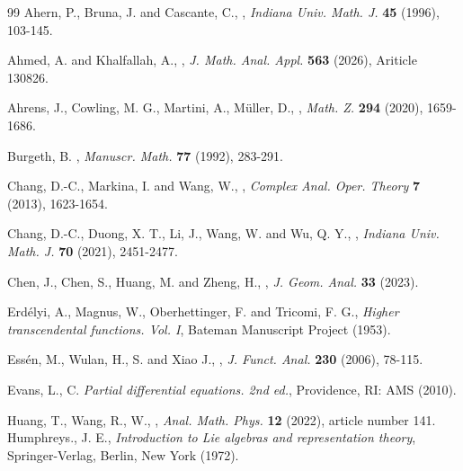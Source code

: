 \documentclass[a4paper,11pt]{amsart}
\numberwithin{equation}{section}
\begin{document}
\begin{thebibliography}{99}
Ahern, P., Bruna, J. and Cascante, C.,
, {\it Indiana Univ. Math. J.} \textbf{45} (1996), 103-145.

Ahmed, A. and Khalfallah, A.,
, {\it J. Math. Anal. Appl.} \textbf{563} (2026), Ariticle 130826.


Ahrens, J., Cowling, M. G., Martini, A., M\"{u}ller, D.,
, {\it Math. Z.} \textbf{294} (2020), 1659-1686.


Burgeth, B.
, {\it Manuscr. Math.} \textbf{77} (1992), 283-291.

Chang, D.-C., Markina, I. and  Wang, W., , \emph{Complex Anal. Oper. Theory} \textbf{7} (2013), 1623-1654.

Chang, D.-C., Duong, X. T., Li, J., Wang, W. and Wu, Q. Y., , {\it  Indiana Univ. Math. J.} \textbf{70} (2021), 2451-2477.

Chen, J., Chen, S., Huang, M. and Zheng, H., , {\it  J. Geom. Anal.} \textbf{33} (2023).


Erd{\'e}lyi, A., Magnus, W., Oberhettinger, F. and Tricomi, F. G.,
{\it Higher transcendental functions. {Vol}. {I}}, {\rm Bateman Manuscript Project} (1953).


Ess\'{e}n, M., Wulan, H., S. and Xiao J.,
,
{\it J. Funct. Anal. } \textbf{230} (2006), 78-115.

Evans, L., C.
{\it Partial differential equations. 2nd ed.}, {\rm Providence, RI: AMS} (2010).

Huang, T., Wang, R., W.,
,
{\it  Anal. Math. Phys.} \textbf{12} (2022), article number 141.
Humphreys., J. E.,
{\it Introduction to Lie algebras and representation theory}, {\rm Springer-Verlag, Berlin, New York} (1972).



\end{thebibliography}
\end{document}
